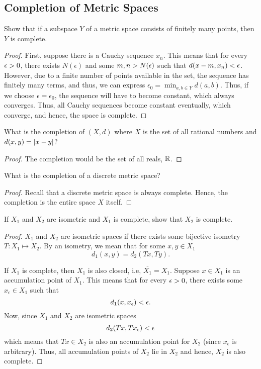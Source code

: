 \subsection{Completion of Metric Spaces}

\begin{question}
    Show that if a subspace $Y$ of a metric space consists of finitely many points, then $Y$ is complete.
    \label{section1.6-1}
\end{question}
\begin{proof}
    First, suppose there is a Cauchy sequence $x_n$. This means that for every $\epsilon > 0$, there exists $N(\epsilon)$ and some $m,n > N(\epsilon)$ such that $d(x-m , x_n) < \epsilon$. However, due to a finite number of points available in the set, the sequence has finitely many terms, and thus, we can express $\epsilon_0 = \min_{a , b \in Y} d(a,b)$. Thus, if we choose $\epsilon = \epsilon_0$, the sequence will have to become constant, which always converges. Thus, all Cauchy sequences become constant eventually, which converge, and hence, the space is complete.
\end{proof}

\begin{question}
    What is the completion of $(X,d)$ where $X$ is the set of all rational numbers and $d(x,y) = \left\lvert x-y \right\rvert$?
    \label{section1.6-2}
\end{question}
\begin{proof}
    The completion would be the set of all reals, $\mathbb{R}$.
\end{proof}

\begin{question}
    What is the completion of a discrete metric space?
    \label{section1.6-3}
\end{question}
\begin{proof}
    Recall that a discrete metric space is always complete. Hence, the completion is the entire space $X$ itself.
\end{proof}

\begin{question}
    If $X_1$ and $X_2$ are isometric and $X_1$ is complete, show that $X_2$ is complete.
    \label{section1.6-4}
\end{question}
\begin{proof}
    $X_1$ and $X_2$ are isometric spaces if there exists some bijective isometry $T : X_1 \mapsto X_2$. By an isometry, we mean that for some $x , y \in X_1$
    \[d_1(x,y) = d_2(Tx , Ty).\]

    If $X_1$ is complete, then $X_1$ is also closed, i.e, $\overline{X_1} = X_1$. Suppose $x \in X_1$ is an accumulation point of $X_1$. This means that for every $\epsilon> 0$, there exists some $x_\epsilon \in X_1$ such that 
    \[d_1(x , x_\epsilon) < \epsilon.\]
    Now, since $X_1$ and $X_2$ are isometric spaces
    \[d_2(Tx , Tx_\epsilon) < \epsilon\]
    which means that $Tx \in X_2$ is also an accumulation point for $X_2$ (since $x_\epsilon$ is arbitrary). Thus, all accumulation points of $X_2$ lie in $X_2$ and hence, $X_2$ is also complete.
\end{proof}

